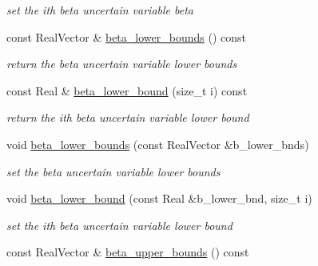 \begin{DoxyCompactItemize}
\begin{DoxyCompactList}\small\item\em set the ith beta uncertain variable beta \end{DoxyCompactList}\item 
const Real\+Vector \& \hyperlink{classPecos_1_1AleatoryDistParams_a8f4aab6f5b3eaf9cbdcbcf6d5303b63b}{beta\+\_\+lower\+\_\+bounds} () const \label{classPecos_1_1AleatoryDistParams_a8f4aab6f5b3eaf9cbdcbcf6d5303b63b}

\begin{DoxyCompactList}\small\item\em return the beta uncertain variable lower bounds \end{DoxyCompactList}\item 
const Real \& \hyperlink{classPecos_1_1AleatoryDistParams_a87eb0a5a03dbea562a2b4dea657f1129}{beta\+\_\+lower\+\_\+bound} (size\+\_\+t i) const \label{classPecos_1_1AleatoryDistParams_a87eb0a5a03dbea562a2b4dea657f1129}

\begin{DoxyCompactList}\small\item\em return the ith beta uncertain variable lower bound \end{DoxyCompactList}\item 
void \hyperlink{classPecos_1_1AleatoryDistParams_a3ed838daabce6f0c567473d23fa0bd4e}{beta\+\_\+lower\+\_\+bounds} (const Real\+Vector \&b\+\_\+lower\+\_\+bnds)\label{classPecos_1_1AleatoryDistParams_a3ed838daabce6f0c567473d23fa0bd4e}

\begin{DoxyCompactList}\small\item\em set the beta uncertain variable lower bounds \end{DoxyCompactList}\item 
void \hyperlink{classPecos_1_1AleatoryDistParams_ad5c43d3dbaad25ec742a889c660cd8be}{beta\+\_\+lower\+\_\+bound} (const Real \&b\+\_\+lower\+\_\+bnd, size\+\_\+t i)\label{classPecos_1_1AleatoryDistParams_ad5c43d3dbaad25ec742a889c660cd8be}

\begin{DoxyCompactList}\small\item\em set the ith beta uncertain variable lower bound \end{DoxyCompactList}\item 
const Real\+Vector \& \hyperlink{classPecos_1_1AleatoryDistParams_ab988391f34322a857a704238b8b83b71}{beta\+\_\+upper\+\_\+bounds} () const \label{classPecos_1_1AleatoryDistParams_ab988391f34322a857a704238b8b83b71}


\end{DoxyCompactItemize}
